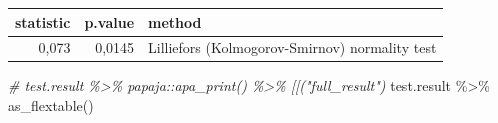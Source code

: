\documentclass[
]{book}
\newenvironment{Shaded}{\begin{snugshade}}{\end{snugshade}}
\newcommand{\CommentTok}[1]{\textcolor[rgb]{0.56,0.35,0.01}{\textit{#1}}}
\newcommand{\FunctionTok}[1]{\textcolor[rgb]{0.00,0.00,0.00}{#1}}
\newcommand{\NormalTok}[1]{#1}
\newcommand{\SpecialCharTok}[1]{\textcolor[rgb]{0.00,0.00,0.00}{#1}}
\begin{document}
\begin{tabular}{r|r|l}
\hline
statistic & p.value & method\\
\hline
0,073 & 0,0145 & Lilliefors (Kolmogorov-Smirnov) normality test\\
\hline
\end{tabular}

\begin{Shaded}
\begin{Highlighting}[]
\CommentTok{\# test.result \%\textgreater{}\% papaja::apa\_print() \%\textgreater{}\% \textasciigrave{}[[\textasciigrave{}("full\_result")}
\NormalTok{test.result }\SpecialCharTok{\%\textgreater{}\%} \FunctionTok{as\_flextable}\NormalTok{()}
\end{Highlighting}
\end{Shaded}

\providecommand{\docline}[3]{\noalign{\global\setlength{\arrayrulewidth}{#1}}\arrayrulecolor[HTML]{#2}\cline{#3}}

\setlength{\tabcolsep}{2pt}

\renewcommand*{\arraystretch}{1.5}
\end{document}
